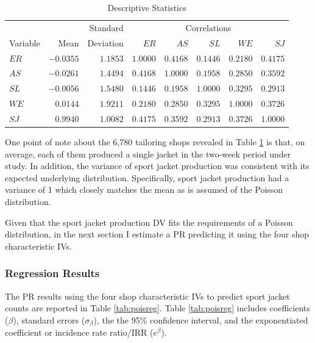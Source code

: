 \documentclass[ShortAfour,times,sageapa]{sagej}
\begin{document}
	\begin{table}[h!]
		\centering
		\caption{\centering Descriptive Statistics} 
		\begin{tabular}{lrr|rrrrr}
			\toprule
			&  & Standard & \multicolumn{5}{c}{Correlations} \\ 
			\cmidrule(lr){4-8}
			Variable & Mean & Deviation & $ER$ & $AS$ & $SL$ & $WE$ & $SJ$ \\ 
			\midrule
			$ER$ & $-0.0355$ & $1.1853$ & $1.0000$ & $0.4168$ & $0.1446$ & $0.2180$ & $0.4175$ \\ 
			$AS$ & $-0.0261$ & $1.4494$ & $0.4168$ & $1.0000$ & $0.1958$ & $0.2850$ & $0.3592$ \\ 
			$SL$ & $-0.0056$ & $1.5480$ & $0.1446$ & $0.1958$ & $1.0000$ & $0.3295$ & $0.2913$ \\ 
			$WE$ & $0.0144$ & $1.9211$ & $0.2180$ & $0.2850$ & $0.3295$ & $1.0000$ & $0.3726$ \\ 
			$SJ$ & $0.9940$ & $1.0082$ & $0.4175$ & $0.3592$ & $0.2913$ & $0.3726$ & $1.0000$ \\ 
			\bottomrule
		\end{tabular}
		\label{tab:desc}
	\end{table}

	One point of note about the 6,780 tailoring shops revealed in Table \ref{tab:desc} is that, on average, each of them produced a single jacket in the two-week period under study.
	In addition, the variance of sport jacket production was consistent with its expected underlying distribution.
	Specifically, sport jacket production had a variance of 1 which closely matches the mean as is assumed of the Poisson distribution. 
	
	Given that the sport jacket production DV fits the requirements of a Poisson distribution, in the next section I estimate a PR predicting it using the four shop characteristic IVs.

		\subsubsection{Regression Results}
		
	The PR results using the four shop characteristic IVs to predict sport jacket counts are reported in Table \ref{tab:poisreg}. 
	Table \ref{tab:poisreg} includes coefficients ($\beta$), standard errors ($\sigma_{\beta}$), the the 95\% confidence interval, and the exponentiated coefficient or incidence rate ratio/IRR ($e^{\beta}$).
	
\end{document}
